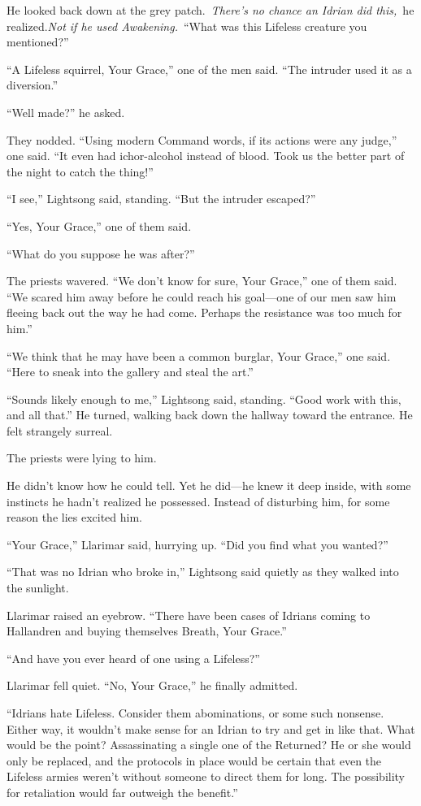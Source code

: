 He looked back down at the grey patch.~\textit{There’s no chance an Idrian did this,}~he realized.\textit{Not if he used Awakening.}~“What was this Lifeless creature you mentioned?”

“A Lifeless squirrel, Your Grace,” one of the men said. “The intruder used it as a diversion.”

“Well made?” he asked.

They nodded. “Using modern Command words, if its actions were any judge,” one said. “It even had ichor-alcohol instead of blood. Took us the better part of the night to catch the thing!”

“I see,” Lightsong said, standing. “But the intruder escaped?”

“Yes, Your Grace,” one of them said.

“What do you suppose he was after?”

The priests wavered. “We don’t know for sure, Your Grace,” one of them said. “We scared him away before he could reach his goal—one of our men saw him fleeing back out the way he had come. Perhaps the resistance was too much for him.”

“We think that he may have been a common burglar, Your Grace,” one said. “Here to sneak into the gallery and steal the art.”

“Sounds likely enough to me,” Lightsong said, standing. “Good work with this, and all that.” He turned, walking back down the hallway toward the entrance. He felt strangely surreal.

The priests were lying to him.

He didn’t know how he could tell. Yet he did—he knew it deep inside, with some instincts he hadn’t realized he possessed. Instead of disturbing him, for some reason the lies excited him.

“Your Grace,” Llarimar said, hurrying up. “Did you find what you wanted?”

“That was no Idrian who broke in,” Lightsong said quietly as they walked into the sunlight.

Llarimar raised an eyebrow. “There have been cases of Idrians coming to Hallandren and buying themselves Breath, Your Grace.”

“And have you ever heard of one using a Lifeless?”

Llarimar fell quiet. “No, Your Grace,” he finally admitted.

“Idrians hate Lifeless. Consider them abominations, or some such nonsense. Either way, it wouldn’t make sense for an Idrian to try and get in like that. What would be the point? Assassinating a single one of the Returned? He or she would only be replaced, and the protocols in place would be certain that even the Lifeless armies weren’t without someone to direct them for long. The possibility for retaliation would far outweigh the benefit.”

